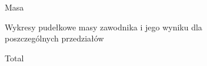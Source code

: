 \documentclass[
  letterpaper,
  DIV=11,
  numbers=noendperiod]{scrartcl}
\begin{document}
\begin{figure}

\begin{minipage}[t]{0.50\linewidth}

{\centering 


\caption{Masa}

}

\end{minipage}%
%
\begin{minipage}[t]{0.50\linewidth}

{\centering 


\caption{Total}

}

\end{minipage}%
\newline
\begin{minipage}[t]{0.50\linewidth}

{\centering 

Wykresy pudełkowe masy zawodnika i jego wyniku dla poszczególnych
przedziałów

}

\end{minipage}%

\end{figure}
\end{document}
